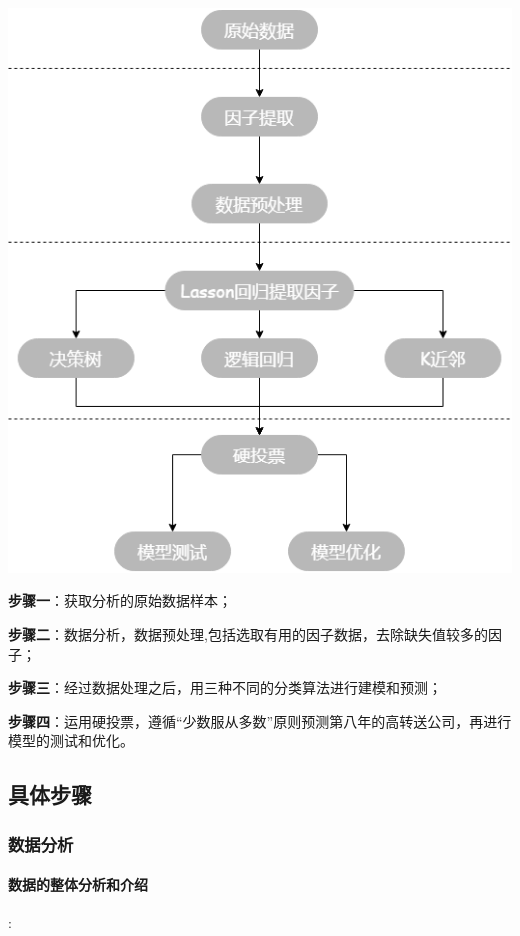 \documentclass[lang=cn,12pt]{elegantpaper}
\begin{document}
\begin{center}
\includegraphics[scale=0.5]{1.png}
\end{center}


\textbf{步骤一}：获取分析的原始数据样本；

\textbf{步骤二}：数据分析，数据预处理,包括选取有用的因子数据，去除缺失值较多的因子；

\textbf{步骤三}：经过数据处理之后，用三种不同的分类算法进行建模和预测；

\textbf{步骤四}：运用硬投票，遵循“少数服从多数”原则预测第八年的高转送公司，再进行模型的测试和优化。

\subsection{具体步骤}

\subsubsection{数据分析}

\paragraph{数据的整体分析和介绍}:
\end{document}
